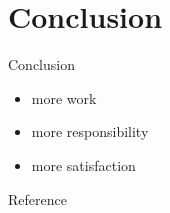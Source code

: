 \documentclass[9pt]{beamer}
\begin{document}
\section{Conclusion}
\begin{frame}{Conclusion}
  \begin{itemize}
    \item more work
    \medskip
    \item more responsibility
    \medskip
    \item more satisfaction
  \end{itemize}
    
\end{frame}

\nocite{*}
\begin{frame}[allowframebreaks]{Reference}


\end{frame}
\end{document}
